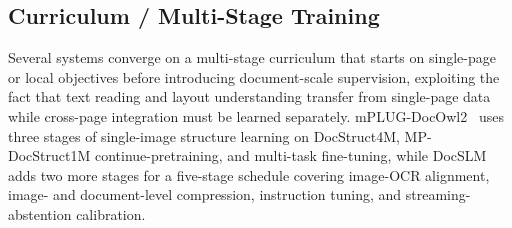 \documentclass[11pt]{article}
\begin{document}

\subsection{Curriculum / Multi-Stage Training}
\label{sec:train-curriculum}
Several systems converge on a multi-stage curriculum that starts on single-page or local objectives before introducing document-scale supervision, exploiting the fact that text reading and layout understanding transfer from single-page data while cross-page integration must be learned separately. mPLUG-DocOwl2~\cite{hu2025mplug2} uses three stages of single-image structure learning on DocStruct4M, MP-DocStruct1M continue-pretraining, and multi-task fine-tuning, while DocSLM~\cite{hannan2025docslm} adds two more stages for a five-stage schedule covering image-OCR alignment, image- and document-level compression, instruction tuning, and streaming-abstention calibration.
\end{document}
